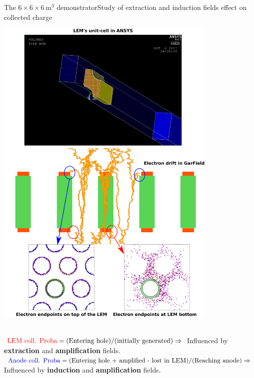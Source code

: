 \documentclass[10pt]{beamer}
\begin{document}
\begin{frame}{The \texorpdfstring{$6 \times 6 \times \SI{6}{\meter\cubed}$}{666}  demonstrator}{Study of extraction and induction fields effect on collected charge}
\begin{scriptsize}
\begin{minipage}{0.48\textwidth}
    			\includegraphics[width=0.8\textwidth]{figures/666/coll_proba.png}\\
    		\end{minipage}\\
    		\vspace{0.2cm}
	    	$\textcolor{red}{\text{LEM coll. Proba}}=\text{(Entering hole)}/\text{(initially generated)} \Rightarrow$ Influenced by \textbf{extraction} and \textbf{amplification} fields. \\
	    	$\textcolor{blue}{\text{Anode coll. Proba}}=\text{(Entering hole + amplified - lost in LEM)}/\text{(Reaching anode)}\Rightarrow$ Influenced by \textbf{induction} and \textbf{amplification} fields.
	    \end{scriptsize} 
    \end{frame}
    
\end{document}
